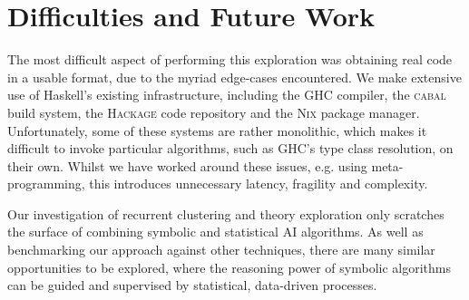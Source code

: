 \documentclass[]{sig-alternate}
\begin{document}
\section{Difficulties and Future Work}\label{future-work}

The most difficult aspect of performing this exploration was obtaining real code in a usable format, due to the myriad edge-cases encountered. We make extensive use of Haskell's existing infrastructure, including the \textsc{GHC} compiler, the \textsc{cabal} build system, the \textsc{Hackage} code repository and the \textsc{Nix} package manager. Unfortunately, some of these systems are rather monolithic, which makes it difficult to invoke particular algorithms, such as \textsc{GHC}'s type class resolution, on their own. Whilst we have worked around these issues, e.g. using meta-programming, this introduces unnecessary latency, fragility and complexity.

Our investigation of recurrent clustering and theory exploration only scratches the surface of combining symbolic and statistical AI algorithms. As well as benchmarking our approach against other techniques, there are many similar opportunities to be explored, where the reasoning power of symbolic algorithms can be guided and supervised by statistical, data-driven processes.



\end{document}
